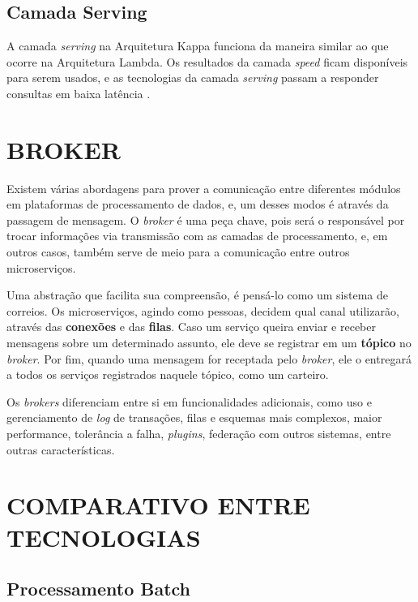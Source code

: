 \subsection{Camada Serving}

A camada \textit{serving} na Arquitetura Kappa funciona da maneira similar ao
que ocorre na Arquitetura Lambda. Os resultados da camada \textit{speed}
ficam disponíveis para serem usados, e as tecnologias da camada \textit{serving}
passam a responder consultas em baixa latência \cite{forgeat2015}.

\section{BROKER}

Existem várias abordagens para prover a comunicação entre diferentes módulos em
plataformas de processamento de dados, e, um desses modos é através da passagem
de mensagem. O \textit{broker} é uma peça chave, pois será o responsável por
trocar informações via transmissão com as camadas de processamento, e, em outros
casos, também serve de meio para a comunicação entre outros
microserviços\cite{marz2015}.

Uma abstração que facilita sua compreensão, é pensá-lo como um sistema de
correios. Os microserviços, agindo como pessoas, decidem qual canal
utilizarão, através das \textbf{conexões} e das \textbf{filas}. Caso um serviço
queira enviar e receber mensagens sobre um determinado assunto, ele deve se
registrar em um \textbf{tópico} no \textit{broker}. Por fim, quando uma
mensagem for receptada pelo \textit{broker}, ele o entregará a todos os
serviços registrados naquele tópico, como um carteiro.

Os \textit{brokers} diferenciam entre si em funcionalidades adicionais, como
uso e gerenciamento de \textit{log} de transações, filas e esquemas mais
complexos, maior performance, tolerância a falha, \textit{plugins}, federação
com outros sistemas, entre outras características.

\section{COMPARATIVO ENTRE TECNOLOGIAS}

\subsection{Processamento Batch}


